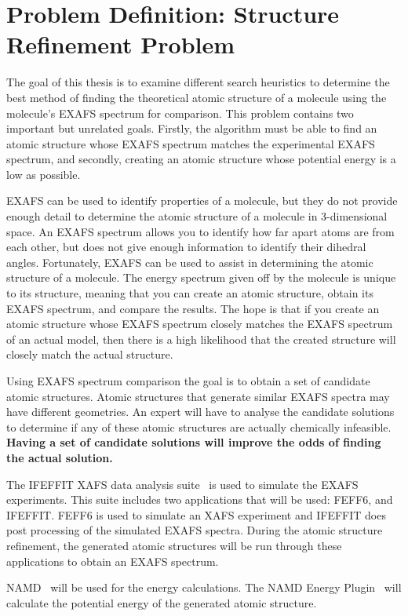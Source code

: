 \section{Problem Definition: Structure Refinement Problem}
\label{sec:problem-definition}

The goal of this thesis is to examine different search heuristics to determine the best method of finding the theoretical atomic structure of a molecule using the molecule's EXAFS spectrum for comparison. This problem contains two important but unrelated goals. Firstly, the algorithm must be able to find an atomic structure whose EXAFS spectrum matches the experimental EXAFS spectrum, and secondly, creating an atomic structure whose potential energy is a low as possible.

EXAFS can be used to identify properties of a molecule, but they do not provide enough detail to determine the atomic structure of a molecule in 3-dimensional space. An EXAFS spectrum allows you to identify how far apart atoms are from each other, but does not give enough information to identify their dihedral angles. Fortunately, EXAFS can be used to assist in determining the atomic structure of a molecule. The energy spectrum given off by the molecule is unique to its structure, meaning that you can create an atomic structure, obtain its EXAFS spectrum, and compare the results. The hope is that if you create an atomic structure whose EXAFS spectrum closely matches the EXAFS spectrum of an actual model, then there is a high likelihood that the created structure will closely match the actual structure.

Using EXAFS spectrum comparison the goal is to obtain a set of candidate atomic structures. Atomic structures that generate similar EXAFS spectra may have different geometries. An expert will have to analyse the candidate solutions to determine if any of these atomic structures are actually chemically infeasible. \textbf{Having a set of candidate solutions will improve the odds of finding the actual solution.}

The IFEFFIT XAFS data analysis suite~\cite{ifeffit} is used to simulate the EXAFS experiments. This suite includes two applications that will be used: FEFF6, and IFEFFIT. FEFF6 is used to simulate an XAFS experiment and IFEFFIT does post processing of the simulated EXAFS spectra. During the atomic structure refinement, the generated atomic structures will be run through these applications to obtain an EXAFS spectrum.

NAMD~\cite{namd} will be used for the energy calculations. The NAMD Energy Plugin~\cite{namdEnergy}  will calculate the potential energy of the generated atomic structure.

